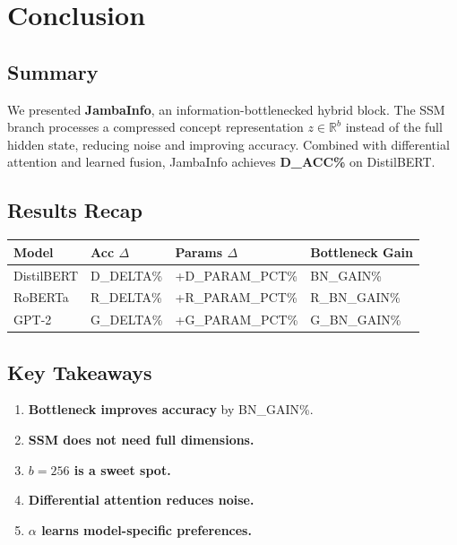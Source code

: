 \section{Conclusion}

\subsection{Summary}

We presented \textbf{JambaInfo}, an information-bottlenecked hybrid block. The 
SSM branch processes a compressed concept representation $z \in \mathbb{R}^b$ 
instead of the full hidden state, reducing noise and improving accuracy. 
Combined with differential attention and learned fusion, JambaInfo achieves 
\textbf{{{D\_ACC}}\%} on DistilBERT.

\subsection{Results Recap}

\begin{table}[H]
\centering
\small
\begin{tabular}{llll}
\toprule
\textbf{Model} & \textbf{Acc $\Delta$} & \textbf{Params $\Delta$} & \textbf{Bottleneck Gain} \\
\midrule
DistilBERT & {{D\_DELTA}}\% & +{{D\_PARAM\_PCT}}\% & {{BN\_GAIN}}\% \\
RoBERTa & {{R\_DELTA}}\% & +{{R\_PARAM\_PCT}}\% & {{R\_BN\_GAIN}}\% \\
GPT-2 & {{G\_DELTA}}\% & +{{G\_PARAM\_PCT}}\% & {{G\_BN\_GAIN}}\% \\
\bottomrule
\end{tabular}
\end{table}

\subsection{Key Takeaways}

\begin{enumerate}
\item \textbf{Bottleneck improves accuracy} by {{BN\_GAIN}}\%.
\item \textbf{SSM does not need full dimensions.}
\item \textbf{$b = 256$ is a sweet spot.}
\item \textbf{Differential attention reduces noise.}
\item \textbf{$\alpha$ learns model-specific preferences.}

\end{enumerate}
